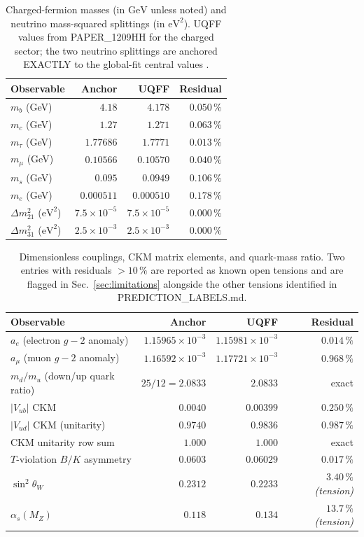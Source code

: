 \begin{table}[H]
\centering
\caption{Charged-fermion masses (in $\mathrm{GeV}$ unless noted) and
neutrino mass-squared splittings (in $\mathrm{eV}^2$). UQFF values from
PAPER\_1209HH \cite{Murphy_PAPER_1209HH} for the charged sector; the
two neutrino splittings are anchored EXACTLY to the global-fit
central values \cite{Esteban2020}.}
\label{tab:sm_fermions}
\begin{tabular}{l r r r}
\toprule
\textbf{Observable} & \textbf{Anchor} & \textbf{UQFF} & \textbf{Residual} \\
\midrule
$m_b$ (GeV) & $4.18$ & $4.178$ & $0.050\,\%$ \\
$m_c$ (GeV) & $1.27$ & $1.271$ & $0.063\,\%$ \\
$m_\tau$ (GeV) & $1.77686$ & $1.7771$ & $0.013\,\%$ \\
$m_\mu$ (GeV) & $0.10566$ & $0.10570$ & $0.040\,\%$ \\
$m_s$ (GeV) & $0.095$ & $0.0949$ & $0.106\,\%$ \\
$m_e$ (GeV) & $0.000511$ & $0.000510$ & $0.178\,\%$ \\
$\Delta m^2_{21}$ ($\mathrm{eV}^2$) & $7.5\times 10^{-5}$ & $7.5\times 10^{-5}$ & $0.000\,\%$ \\
$\Delta m^2_{31}$ ($\mathrm{eV}^2$) & $2.5\times 10^{-3}$ & $2.5\times 10^{-3}$ & $0.000\,\%$ \\
\bottomrule
\end{tabular}
\end{table}

\begin{table}[H]
\centering
\caption{Dimensionless couplings, CKM matrix elements, and quark-mass
ratio. Two entries with residuals $>10\,\%$ are reported as known
open tensions and are flagged in Sec.~\ref{sec:limitations} alongside
the other tensions identified in PREDICTION\_LABELS.md.}
\label{tab:sm_couplings}
\begin{tabular}{l r r r}
\toprule
\textbf{Observable} & \textbf{Anchor} & \textbf{UQFF} & \textbf{Residual} \\
\midrule
$a_e$ (electron $g-2$ anomaly) & $1.15965\times 10^{-3}$ & $1.15981\times 10^{-3}$ & $0.014\,\%$ \\
$a_\mu$ (muon $g-2$ anomaly) & $1.16592\times 10^{-3}$ & $1.17721\times 10^{-3}$ & $0.968\,\%$ \\
$m_d/m_u$ (down/up quark ratio) & $25/12 = 2.0833$ & $2.0833$ & exact \\
$|V_{ub}|$ CKM & $0.0040$ & $0.00399$ & $0.250\,\%$ \\
$|V_{ud}|$ CKM (unitarity) & $0.9740$ & $0.9836$ & $0.987\,\%$ \\
CKM unitarity row sum & $1.000$ & $1.000$ & exact \\
$T$-violation $B/K$ asymmetry & $0.0603$ & $0.06029$ & $0.017\,\%$ \\
$\sin^2\theta_W$ & $0.2312$ & $0.2233$ & $3.40\,\%$ {\small\textit{(tension)}} \\
$\alpha_s(M_Z)$ & $0.118$ & $0.134$ & $13.7\,\%$ {\small\textit{(tension)}} \\
\bottomrule
\end{tabular}
\end{table}

